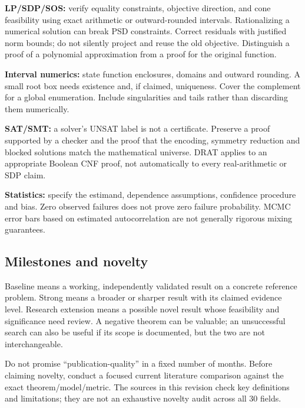 \documentclass[
  11pt,
]{article}
\begin{document}
\textbf{LP/SDP/SOS:} verify equality constraints, objective direction,
and cone feasibility using exact arithmetic or outward-rounded
intervals. Rationalizing a numerical solution can break PSD constraints.
Correct residuals with justified norm bounds; do not silently project
and reuse the old objective. Distinguish a proof of a polynomial
approximation from a proof for the original function.

\textbf{Interval numerics:} state function enclosures, domains and
outward rounding. A small root box needs existence and, if claimed,
uniqueness. Cover the complement for a global enumeration. Include
singularities and tails rather than discarding them numerically.

\textbf{SAT/SMT:} a solver's UNSAT label is not a certificate. Preserve
a proof supported by a checker and the proof that the encoding, symmetry
reduction and blocked solutions match the mathematical universe. DRAT
applies to an appropriate Boolean CNF proof, not automatically to every
real-arithmetic or SDP claim.

\textbf{Statistics:} specify the estimand, dependence assumptions,
confidence procedure and bias. Zero observed failures does not prove
zero failure probability. MCMC error bars based on estimated
autocorrelation are not generally rigorous mixing guarantees.

\subsection{Milestones and novelty}

Baseline means a working, independently validated result on a concrete
reference problem. Strong means a broader or sharper result with its
claimed evidence level. Research extension means a possible novel result
whose feasibility and significance need review. A negative theorem can
be valuable; an unsuccessful search can also be useful if its scope is
documented, but the two are not interchangeable.

Do not promise ``publication-quality'' in a fixed number of months.
Before claiming novelty, conduct a focused current literature comparison
against the exact theorem/model/metric. The sources in this revision
check key definitions and limitations; they are not an exhaustive
novelty audit across all 30 fields.
\end{document}
